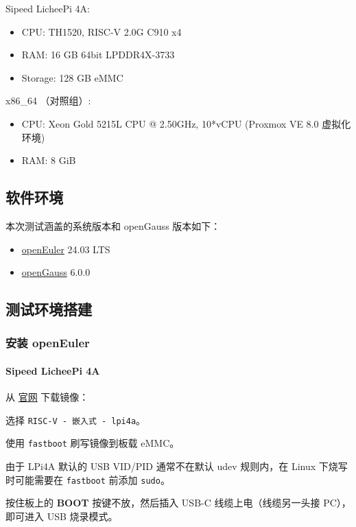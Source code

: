 \documentclass{article}
\begin{document}
Sipeed LicheePi 4A:
\begin{itemize}
    \item CPU: TH1520, RISC-V 2.0G C910 x4
    \item RAM: 16 GB 64bit LPDDR4X-3733
    \item Storage: 128 GB eMMC
\end{itemize}

x86\_64 （对照组）:
\begin{itemize}
    \item CPU: Xeon Gold 5215L CPU @ 2.50GHz, 10*vCPU (Proxmox VE 8.0 虚拟化环境)
    \item RAM: 8 GiB
\end{itemize}

\subsection{软件环境}
本次测试涵盖的系统版本和 openGauss 版本如下：

\begin{itemize}
    \item \href{https://www.openeuler.org/zh/download/?version=openEuler%2024.03%20LTS}{openEuler} 24.03 LTS
    \item \href{https://gitee.com/opengauss/riscv}{openGauss} 6.0.0
\end{itemize}

\subsection{测试环境搭建}

\subsubsection{安装 openEuler}

\paragraph{Sipeed LicheePi 4A}

从 \href{https://www.openeuler.org/zh/download/?version=openEuler%2024.03%20LTS}{官网} 下载镜像：

选择 \verb|RISC-V - 嵌入式 - lpi4a|。

使用 \verb|fastboot| 刷写镜像到板载 eMMC。

由于 LPi4A 默认的 USB VID/PID 通常不在默认 udev 规则内，在 Linux 下烧写时可能需要在 \verb|fastboot| 前添加 \verb|sudo|。

按住板上的 \textbf{BOOT} 按键不放，然后插入 USB-C 线缆上电（线缆另一头接 PC），即可进入 USB 烧录模式。
\end{document}
